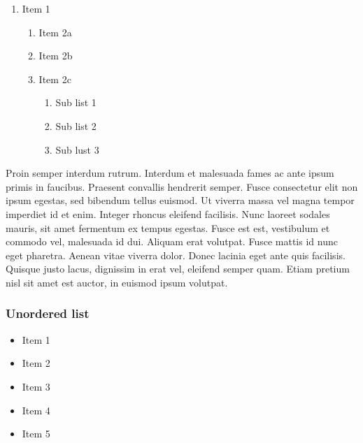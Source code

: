 \documentclass{article}
\begin{document}
\begin{enumerate}
\item Item 1

\begin{enumerate}
\item Item 2a


\item Item 2b


\item Item 2c

\begin{enumerate}
\item Sub list 1


\item Sub list 2


\item Sub lust 3


\end{enumerate}

\end{enumerate}

\end{enumerate}

Proin semper interdum rutrum. Interdum et malesuada fames ac ante ipsum primis in faucibus. Praesent convallis hendrerit semper. Fusce consectetur elit non ipsum egestas, sed bibendum tellus euismod. Ut viverra massa vel magna tempor imperdiet id et enim. Integer rhoncus eleifend facilisis. Nunc laoreet sodales mauris, sit amet fermentum ex tempus egestas. Fusce est est, vestibulum et commodo vel, malesuada id dui. Aliquam erat volutpat. Fusce mattis id nunc eget pharetra. Aenean vitae viverra dolor. Donec lacinia eget ante quis facilisis. Quisque justo lacus, dignissim in erat vel, eleifend semper quam. Etiam pretium nisl sit amet est auctor, in euismod ipsum volutpat.


\subsubsection{Unordered list}\label{H1193054}


\begin{itemize}
\item Item 1


\item Item 2


\item Item 3


\item Item 4


\item Item 5


\end{itemize}
\end{document}
